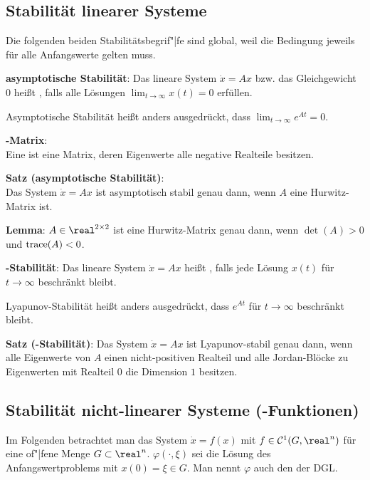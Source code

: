 \pagebreak

\subsection{%
    Stabilität linearer Systeme%
}

Die folgenden beiden Stabilitätsbegrif"|fe sind global, weil die Bedingung
jeweils für alle Anfangswerte gelten muss.

\textbf{asymptotische Stabilität}:
Das lineare System $\dot{x} = Ax$ bzw. das Gleichgewicht $0$ heißt
, falls
alle Lösungen $\lim_{t \to \infty} x(t) = 0$ erfüllen.

Asymptotische Stabilität heißt anders ausgedrückt,
dass $\lim_{t \to \infty} e^{At} = 0$.

\textbf{-Matrix}:\\
Eine  ist eine Matrix, deren Eigenwerte alle negative Realteile
besitzen.

\textbf{Satz (asymptotische Stabilität)}:\\
Das System $\dot{x} = Ax$ ist asymptotisch stabil genau dann,
wenn $A$ eine Hurwitz-Matrix ist.

\textbf{Lemma}:
$A \in \real^{2 \times 2}$ ist eine Hurwitz-Matrix genau dann, wenn $\det(A) > 0$ und
$\operatorname{trace}(A) < 0$.

\linie

\textbf{-Stabilität}:
Das lineare System $\dot{x} = Ax$ heißt ,
falls jede Lösung $x(t)$ für $t \to \infty$ beschränkt bleibt.

Lyapunov-Stabilität heißt anders ausgedrückt,
dass $e^{At}$ für $t \to \infty$ beschränkt bleibt.

\textbf{Satz (-Stabilität)}:
Das System $\dot{x} = Ax$ ist Lyapunov-stabil genau dann, wenn
alle Eigenwerte von $A$ einen nicht-positiven Realteil und
alle Jordan-Blöcke zu Eigenwerten mit Realteil $0$ die Dimension $1$ besitzen.

\pagebreak

\subsection{%
    Stabilität nicht-linearer Systeme (-Funktionen)%
}

Im Folgenden betrachtet man das System $\dot{x} = f(x)$ mit $f \in \C^1(G, \real^n)$
für eine of"|fene Menge $G \subset \real^n$.
$\varphi(\cdot, \xi)$ sei die Lösung des Anfangswertproblems mit $x(0) = \xi \in G$.
Man nennt $\varphi$ auch den  der DGL.


